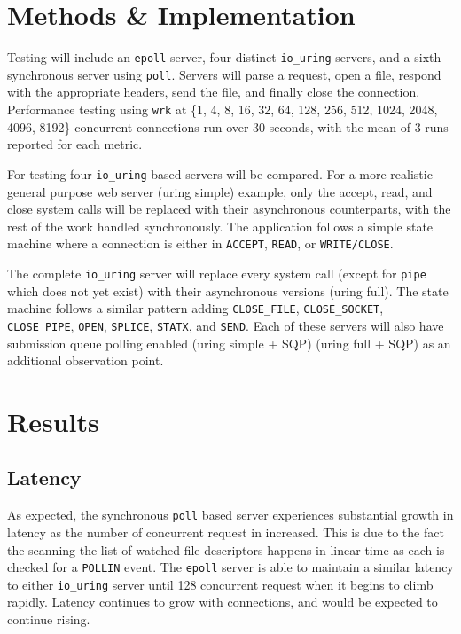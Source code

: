 \documentclass[conference]{IEEEtran}{article}
\begin{document}
\section{Methods \& Implementation}
\label{sec:org1a49c77}
Testing will include an \texttt{epoll} server, four distinct \texttt{io\_uring} servers, and a sixth synchronous server using \texttt{poll}. Servers will parse a request, open a file, respond with the appropriate headers, send the file, and finally close the connection. Performance testing using \texttt{wrk} at \{1, 4, 8, 16, 32, 64, 128, 256, 512, 1024, 2048, 4096, 8192\} concurrent connections run over 30 seconds, with the mean of 3 runs reported for each metric.

For testing four \texttt{io\_uring} based servers will be compared. For a more realistic general purpose web server (uring simple) example, only the accept, read, and close system calls will be replaced with their asynchronous counterparts, with the rest of the work handled synchronously. The application follows a simple state machine where a connection is either in \texttt{ACCEPT}, \texttt{READ}, or \texttt{WRITE/CLOSE}.

The complete \texttt{io\_uring} server will replace every system call (except for \texttt{pipe} which does not yet exist) with their asynchronous versions (uring full). The state machine follows a similar pattern adding \texttt{CLOSE\_FILE}, \texttt{CLOSE\_SOCKET}, \texttt{CLOSE\_PIPE}, \texttt{OPEN}, \texttt{SPLICE}, \texttt{STATX}, and \texttt{SEND}. Each of these servers will also have submission queue polling enabled (uring simple + SQP) (uring full + SQP) as an additional observation point. 

\section{Results}
\label{sec:orgf7a657c}
\subsection{Latency}
\label{sec:org405c27a}
As expected, the synchronous \texttt{poll} based server experiences substantial growth in latency as the number of concurrent request in increased. This is due to the fact the scanning the list of watched file descriptors happens in linear time as each is checked for a \texttt{POLLIN} event. The \texttt{epoll} server is able to maintain a similar latency to either \texttt{io\_uring} server until 128 concurrent request when it begins to climb rapidly. Latency continues to grow with connections, and would be expected to continue rising.
\end{document}
